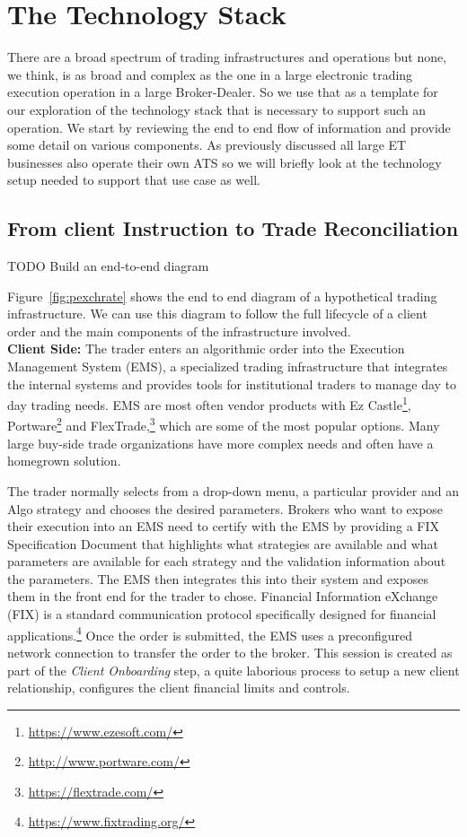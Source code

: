 \chapter{The Technology Stack\label{chap:ch_tech}}

There are a broad spectrum of trading infrastructures and operations but none, we think, is as broad and complex as the one in a large electronic trading execution operation in a large Broker-Dealer. So we use that as a template for our exploration of the technology stack that is necessary to support such an operation. We start by reviewing the end to end flow of information and provide some detail on various components. As previously discussed all large ET businesses also operate their own ATS so we will briefly look at the technology setup needed to support that use case as well.



\section{From client Instruction to Trade Reconciliation}


TODO Build an end-to-end diagram


Figure~\ref{fig:pexchrate} shows the end to end diagram of a hypothetical trading infrastructure. We can use this diagram to follow the full lifecycle of a client order and the main components of the infrastructure involved. \\


\noindent\textbf{Client Side:} The trader enters an algorithmic order into the Execution Management System (EMS), a specialized trading infrastructure that integrates the internal systems and provides tools for institutional traders to manage day to day trading needs. EMS are most often vendor products with Ez Castle\footnote{\url{https://www.ezesoft.com/}}, Portware\footnote{\url{http://www.portware.com/}} and FlexTrade,\footnote{\url{https://flextrade.com/}} which are some of the most popular options. Many large buy-side trade organizations have more complex needs and often have a homegrown solution.


The trader normally selects from a drop-down menu, a particular provider and an Algo strategy and  chooses the desired parameters. Brokers who want to expose their execution into an EMS need to certify with the EMS by providing a FIX Specification Document that highlights what strategies are available and what parameters are available for each strategy and the validation information about the parameters. The EMS then integrates this into their system and exposes them in the front end for the trader to chose. Financial Information eXchange (FIX) is a standard communication protocol specifically designed for financial applications.\footnote{\url{https://www.fixtrading.org/}} Once the order is submitted, the EMS uses a preconfigured network connection to transfer the order to the broker. This session is created as part of the \emph{Client Onboarding} step, a quite laborious process to setup a new client relationship, configures the client financial limits and controls. \\


